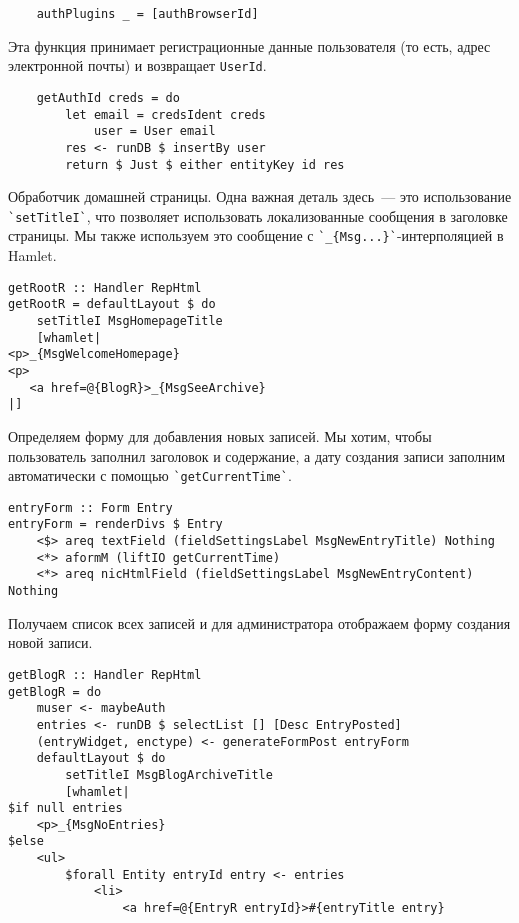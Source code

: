 \begin{lstlisting}
    authPlugins _ = [authBrowserId]
\end{lstlisting}
 
Эта функция принимает регистрационные данные пользователя (то есть, адрес электронной почты) и возвращает \lstinline!UserId!. 
 
\begin{lstlisting}
    getAuthId creds = do
        let email = credsIdent creds
            user = User email
        res <- runDB $ insertBy user
        return $ Just $ either entityKey id res
\end{lstlisting}%
 
Обработчик домашней страницы. Одна важная деталь здесь~--- это использование \lstinline'`setTitleI`', что позволяет использовать локализованные сообщения в заголовке страницы. Мы также используем это сообщение с \lstinline'`_{Msg...}`'-интерполяцией в Hamlet. 
 
\begin{lstlisting}
getRootR :: Handler RepHtml
getRootR = defaultLayout $ do
    setTitleI MsgHomepageTitle
    [whamlet|
<p>_{MsgWelcomeHomepage}
<p>
   <a href=@{BlogR}>_{MsgSeeArchive}
|]
\end{lstlisting}%
 
Определяем форму для добавления новых записей. Мы хотим, чтобы пользователь заполнил заголовок и содержание, а дату создания записи заполним автоматически с помощью \lstinline'`getCurrentTime`'. 
 
\begin{lstlisting}
entryForm :: Form Entry
entryForm = renderDivs $ Entry
    <$> areq textField (fieldSettingsLabel MsgNewEntryTitle) Nothing
    <*> aformM (liftIO getCurrentTime)
    <*> areq nicHtmlField (fieldSettingsLabel MsgNewEntryContent) Nothing
\end{lstlisting}
 
Получаем список всех записей и для администратора отображаем форму создания новой записи. 
 
\begin{lstlisting}
getBlogR :: Handler RepHtml
getBlogR = do
    muser <- maybeAuth
    entries <- runDB $ selectList [] [Desc EntryPosted]
    (entryWidget, enctype) <- generateFormPost entryForm
    defaultLayout $ do
        setTitleI MsgBlogArchiveTitle
        [whamlet|
$if null entries
    <p>_{MsgNoEntries}
$else
    <ul>
        $forall Entity entryId entry <- entries
            <li>
                <a href=@{EntryR entryId}>#{entryTitle entry}
\end{lstlisting}%
 
